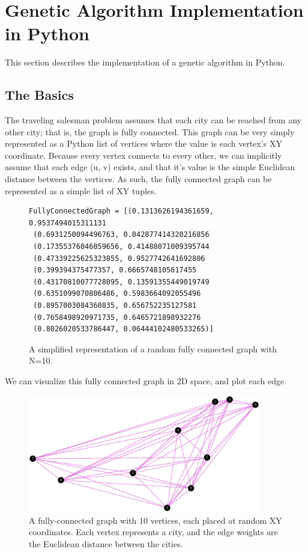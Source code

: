 \section{Genetic Algorithm Implementation in Python}

This section describes the implementation of a genetic algorithm in Python.

\subsection{The Basics}

The traveling salesman problem assumes that each city can be reached from any other city; that is, the graph is fully connected. This graph can be very simply represented as a Python list of vertices where the value is each vertex's XY coordinate. Because every vertex connects to every other, we can implicitly assume that each edge (u, v) exists, and that it's value is the simple Euclidean distance between the vertices. As such, the fully connected graph can be represented as a simple list of XY tuples.

\begin{figure}
\begin{verbatim}
FullyConnectedGraph = [(0.1313626194361659, 0.9537494015311131
 (0.6931250094496763, 0.042877414320216856
 (0.17355376046059656, 0.41488071009395744
 (0.47339225625323855, 0.9527742641692806
 (0.399394375477357, 0.6665748105617455
 (0.43170810077728095, 0.13591355449019749
 (0.6351099070806486, 0.5983664092055496
 (0.8957003084360835, 0.656752235127581
 (0.7658498920971735, 0.6465721898932276
 (0.8026020533786447, 0.06444102480533265)]
\end{verbatim}
\caption{A simplified representation of a random fully connected graph with N=10. }
\end{figure}


We can visualize this fully connected graph in 2D space, and plot each edge. 

\begin{figure}[h!]
\centering
\includegraphics[width=4in]{images/fully_connected_graph.eps}
\caption{A fully-connected graph with 10 vertices, each placed at random XY coordinates. Each vertex represents a city, and the edge weights are the Euclidean distance between the cities.}
\end{figure}

